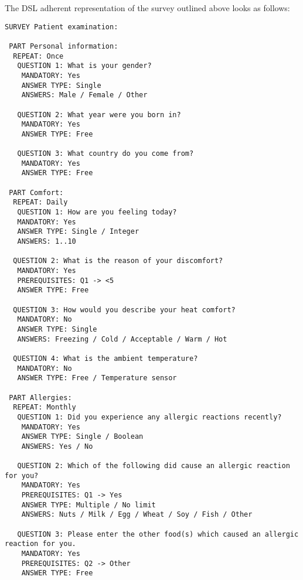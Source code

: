 The DSL adherent representation of the survey outlined above looks as follows:
\begin{verbatim}
SURVEY Patient examination:

 PART Personal information:
  REPEAT: Once
   QUESTION 1: What is your gender?
    MANDATORY: Yes
    ANSWER TYPE: Single 
    ANSWERS: Male / Female / Other
      
   QUESTION 2: What year were you born in?
    MANDATORY: Yes
    ANSWER TYPE: Free

   QUESTION 3: What country do you come from?
    MANDATORY: Yes
    ANSWER TYPE: Free
      
 PART Comfort:
  REPEAT: Daily
   QUESTION 1: How are you feeling today?
   MANDATORY: Yes
   ANSWER TYPE: Single / Integer
   ANSWERS: 1..10
   
  QUESTION 2: What is the reason of your discomfort?
   MANDATORY: Yes
   PREREQUISITES: Q1 -> <5
   ANSWER TYPE: Free
 
  QUESTION 3: How would you describe your heat comfort?
   MANDATORY: No
   ANSWER TYPE: Single
   ANSWERS: Freezing / Cold / Acceptable / Warm / Hot
 
  QUESTION 4: What is the ambient temperature?
   MANDATORY: No
   ANSWER TYPE: Free / Temperature sensor
      
 PART Allergies:  
  REPEAT: Monthly
   QUESTION 1: Did you experience any allergic reactions recently?
    MANDATORY: Yes
    ANSWER TYPE: Single / Boolean
    ANSWERS: Yes / No
 
   QUESTION 2: Which of the following did cause an allergic reaction for you?
    MANDATORY: Yes
    PREREQUISITES: Q1 -> Yes
    ANSWER TYPE: Multiple / No limit
    ANSWERS: Nuts / Milk / Egg / Wheat / Soy / Fish / Other
 
   QUESTION 3: Please enter the other food(s) which caused an allergic reaction for you.
    MANDATORY: Yes
    PREREQUISITES: Q2 -> Other
    ANSWER TYPE: Free
\end{verbatim}

